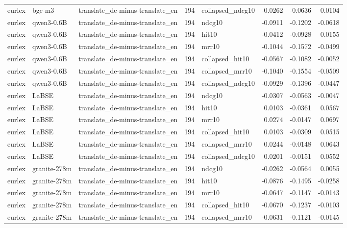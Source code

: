 \begin{tabular}{lllrlrrr}
eurlex & bge-m3 & translate\_de-minus-translate\_en & 194 & collapsed\_ndcg10 & -0.0262 & -0.0636 & 0.0104 \\
eurlex & qwen3-0.6B & translate\_de-minus-translate\_en & 194 & ndcg10 & -0.0911 & -0.1202 & -0.0618 \\
eurlex & qwen3-0.6B & translate\_de-minus-translate\_en & 194 & hit10 & -0.0412 & -0.0928 & 0.0155 \\
eurlex & qwen3-0.6B & translate\_de-minus-translate\_en & 194 & mrr10 & -0.1044 & -0.1572 & -0.0499 \\
eurlex & qwen3-0.6B & translate\_de-minus-translate\_en & 194 & collapsed\_hit10 & -0.0567 & -0.1082 & -0.0052 \\
eurlex & qwen3-0.6B & translate\_de-minus-translate\_en & 194 & collapsed\_mrr10 & -0.1040 & -0.1554 & -0.0509 \\
eurlex & qwen3-0.6B & translate\_de-minus-translate\_en & 194 & collapsed\_ndcg10 & -0.0929 & -0.1396 & -0.0447 \\
eurlex & LaBSE & translate\_de-minus-translate\_en & 194 & ndcg10 & -0.0307 & -0.0563 & -0.0047 \\
eurlex & LaBSE & translate\_de-minus-translate\_en & 194 & hit10 & 0.0103 & -0.0361 & 0.0567 \\
eurlex & LaBSE & translate\_de-minus-translate\_en & 194 & mrr10 & 0.0274 & -0.0147 & 0.0697 \\
eurlex & LaBSE & translate\_de-minus-translate\_en & 194 & collapsed\_hit10 & 0.0103 & -0.0309 & 0.0515 \\
eurlex & LaBSE & translate\_de-minus-translate\_en & 194 & collapsed\_mrr10 & 0.0244 & -0.0148 & 0.0643 \\
eurlex & LaBSE & translate\_de-minus-translate\_en & 194 & collapsed\_ndcg10 & 0.0201 & -0.0151 & 0.0552 \\
eurlex & granite-278m & translate\_de-minus-translate\_en & 194 & ndcg10 & -0.0262 & -0.0564 & 0.0055 \\
eurlex & granite-278m & translate\_de-minus-translate\_en & 194 & hit10 & -0.0876 & -0.1495 & -0.0258 \\
eurlex & granite-278m & translate\_de-minus-translate\_en & 194 & mrr10 & -0.0647 & -0.1147 & -0.0143 \\
eurlex & granite-278m & translate\_de-minus-translate\_en & 194 & collapsed\_hit10 & -0.0670 & -0.1237 & -0.0103 \\
eurlex & granite-278m & translate\_de-minus-translate\_en & 194 & collapsed\_mrr10 & -0.0631 & -0.1121 & -0.0145 \\

\end{tabular}
